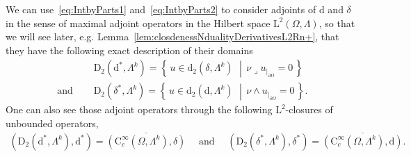 \documentclass[10pt]{amsart}
\theoremstyle{definition}\newtheorem{defi}[theo]{Definition}\newtheorem{rema}[theo]{Remark}\newtheorem{exam}[theo]{Example}\newtheorem{exem}[theo]{Example}\newtheorem{nota}[theo]{Notation}
\newcommand{\rmd}{\mathrm{d}}
\newcommand{\rmD}{\mathrm{D}}
\newcommand{\rmL}{\mathrm{L}}
\newcommand{\rmC}{\mathrm{C}}
\begin{document}
We can use~\eqref{eq:IntbyParts1} and~\eqref{eq:IntbyParts2} to consider adjoints of $\rmd$ and ${\delta}$ in the sense of maximal adjoint operators in the Hilbert space $\rmL^2(\Omega,\Lambda)$, so that we will see later, e.g. Lemma~\ref{lem:closdenessNdualityDerivativesL2Rn+}, that they have the following exact description of their domains
\begin{align*}
&\rmD_{2}\left(\rmd^\ast,\Lambda^k\right) = \left\{\, u\in \rmd_{2}\left({\delta},\Lambda^k\right)\, \,\middle|\, \nu\lrcorner u_{|_{\partial\Omega}} =0\, \right\} \\
\text{ and }\quad &\rmD_{2}\left({\delta}^\ast,\Lambda^k\right) = \left\{\, u\in \rmd_{2}\left(\rmd,\Lambda^k\right)\, \,\middle|\, \nu\wedge u_{|_{\partial\Omega}} =0\, \right\}.
\end{align*}
One can also see those adjoint operators through the following $\rmL^2$-closures of unbounded operators,
\begin{align*}
\left(\rmD_{2}\left(\rmd^\ast,\Lambda^k\right),\rmd^\ast\right) = \overline{\left(\rmC_c^\infty\left(\Omega,\Lambda^k\right),{\delta}\right)}\quad\text{ and }\quad \left(\rmD_{2}\left({\delta}^\ast,\Lambda^k\right),{\delta}^\ast\right) = \overline{\left(\rmC_c^\infty\left(\Omega,\Lambda^k\right),\rmd\right)} .
\end{align*}
\end{document}
